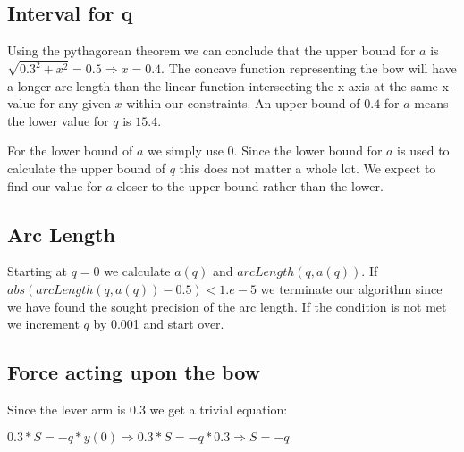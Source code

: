 \begin{center}
    
\end{center}

\subsection{Interval for q}
Using the pythagorean theorem we can conclude that the upper bound for $a$ is $\sqrt{0.3^2+x^2}=0.5 \Rightarrow x=0.4$. The concave function representing the bow will have a longer arc length than the linear function intersecting the x-axis at the same x-value for any given $x$ within our constraints. An upper bound of $0.4$ for $a$ means the lower value for $q$ is $15.4$. 

For the lower bound of $a$ we simply use 0. Since the lower bound for $a$ is used to calculate the upper bound of $q$ this does not matter a whole lot. We expect to find our value for $a$ closer to the upper bound rather than the lower.

\subsection{Arc Length}
Starting at $q=0$ we calculate $a(q)$ and $arcLength(q, a(q))$. If $abs(arcLength(q, a(q))-0.5) < 1.e-5$ we terminate our algorithm since we have found the sought precision of the arc length. If the condition is not met we increment $q$ by 0.001 and start over.

\subsection{Force acting upon the bow}
Since the lever arm is 0.3 we get a trivial equation:

$0.3*S=-q*y(0) \Rightarrow 0.3*S=-q*0.3 \Rightarrow S=-q$
